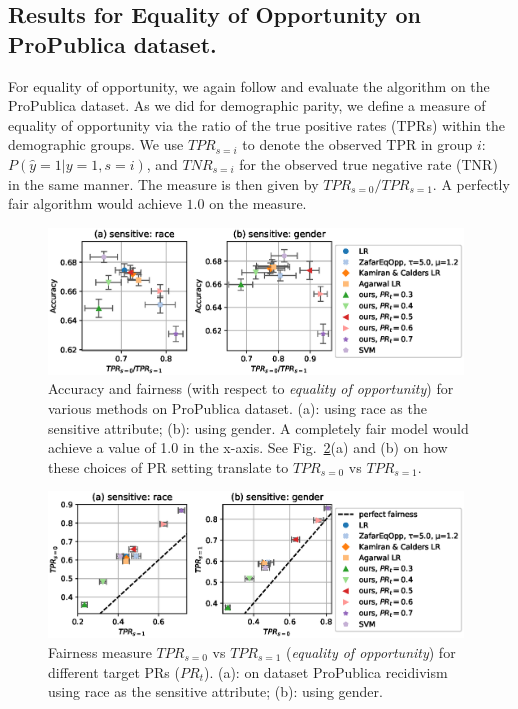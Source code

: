 \subsection{Results for Equality of Opportunity on ProPublica dataset.}\label{sssec:eqoppresults}
%
For equality of opportunity,
we again follow \citet{zafar2017fairnesstreatment} and evaluate the algorithm on the ProPublica dataset.
As we did for demographic parity,
we define a measure of equality of opportunity via the ratio of the true positive rates (TPRs) within the demographic groups.
We use $\mathit{TPR}_{s=i}$ to denote the observed TPR in group $i$: $P(\hat{y}=1|y=1, s=i)$,
and $\mathit{TNR}_{s=i}$ for the observed true negative rate (TNR) in the same manner.
The measure is then given by $\mathit{TPR}_{s=0} / \mathit{TPR}_{s=1}$.
A perfectly fair algorithm would achieve $1.0$ on the measure.%
\begin{figure}[t]
  \centering
  \includegraphics[width=0.98\textwidth]{./figures/propublica_opp_box_with_agarwal.eps}
  \caption{Accuracy and fairness (with respect to \emph{equality of opportunity}) for various methods on ProPublica dataset.
    (a): using race as the sensitive attribute; (b): using gender.
    A completely fair model would achieve a value of 1.0 in the x-axis.
    See Fig.~\ref{fig:propublica_opp_scatter_tpr}(a) and (b) on how these choices of PR setting translate to
    $\mathit{TPR}_{s=0}$ vs $\mathit{TPR}_{s=1}$. %
  }%
  \label{fig:propublica_opp_box}
\end{figure}%
\begin{figure}[!ht]
  \centering
  \includegraphics[width=0.98\textwidth]{./figures/propublica_opp_scatter_tpr.eps}
  \caption{%
    Fairness measure $\mathit{TPR}_{s=0}$ vs $\mathit{TPR}_{s=1}$ (\emph{equality of opportunity}) for different target PRs ($\mathit{PR}_t$).
    (a): on dataset ProPublica recidivism using race as the sensitive attribute;
    (b): using gender.
  }%
  \label{fig:propublica_opp_scatter_tpr}
\end{figure}%

